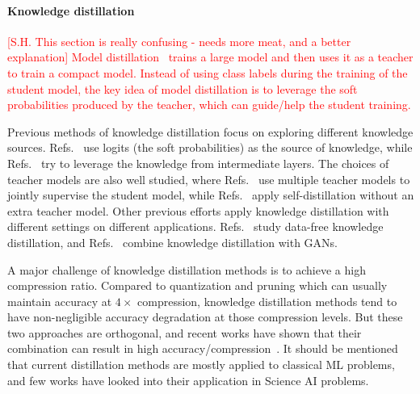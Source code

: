 \paragraph*{Knowledge distillation}
\textcolor{red}{[S.H. This section is really confusing - needs more meat, and a better explanation] Model distillation~\cite{romero2014fitnets, hinton2015distilling, mishra2017apprentice, li2017learning, yim2017gift, polino2018model, ahn2019variational, yin2020dreaming} trains a large model and then uses it as a teacher to train a compact model. Instead of using class labels during the training of the student model, the key idea of model distillation is to leverage the soft probabilities produced by the teacher, 
which can guide/help the student training. }

Previous methods of knowledge distillation focus on exploring different knowledge sources. Refs.~\cite{hinton2015distilling, li2017learning, park2019relational} use logits (the soft probabilities) as the source of knowledge, while Refs.~\cite{romero2014fitnets, yim2017gift, ahn2019variational} try to leverage the knowledge from intermediate layers. The choices of teacher models are also well studied, where Refs.~\cite{you2017learning, tarvainen2017mean} use multiple teacher models to jointly supervise the student model, while Refs.~\cite{crowley2018moonshine, zhang2019your} apply self-distillation without an extra teacher model. Other previous efforts apply knowledge distillation with different settings on different applications. Refs.~\cite{lopes2017data, nayak2019zero, yin2020dreaming} study data-free knowledge distillation, and Refs.~\cite{wang2018kdgan, wang2020minegan} combine knowledge distillation with GANs.

A major challenge of knowledge distillation methods is to achieve a high compression ratio. 
Compared to quantization and pruning which can usually maintain accuracy at $4\times$ compression, knowledge distillation methods tend to have non-negligible accuracy degradation at those compression levels. 
But these two approaches are orthogonal, and recent works have
shown that their combination can result in high accuracy/compression~\cite{polino2018model,mishra2017apprentice,yao2020hawqv3,mao2020ladabert}.
It should be mentioned that current distillation methods are mostly applied to classical ML problems, and few works have looked into their application in Science AI problems.


